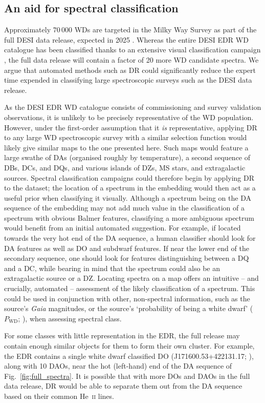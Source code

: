 \documentclass[fleqn,usenatbib]{mnras}
\begin{document}
\subsection{An aid for spectral classification}

Approximately $70\,000$ WDs are targeted in the Milky Way Survey as part of the full DESI data release, expected in 2025 \citep{cooper23}.
Whereas the entire DESI EDR WD catalogue has been classified thanks to an extensive visual classification campaign \citep{manser24}, the full data release will contain a factor of 20 more WD candidate spectra.
We argue that automated methods such as DR could significantly reduce the expert time expended in classifying large spectroscopic surveys such as the DESI data release.

As the DESI EDR WD catalogue consists of commissioning and survey validation observations, it is unlikely to be precisely representative of the WD population.
However, under the first-order assumption that it \textit{is} representative, applying DR to any large WD spectroscopic survey with a similar selection function would likely give similar maps to the one presented here.
Such maps would feature a large swathe of DAs (organised roughly by temperature), a second sequence of DBs, DCs, and DQs, and various islands of DZs, MS stars, and extragalactic sources.
Spectral classification campaigns could therefore begin by applying DR to the dataset; the location of a spectrum in the embedding would then act as a useful prior when classifying it visually.
Although a spectrum being on the DA sequence of the embedding may not add much value in the classification of a spectrum with obvious Balmer features, classifying a more ambiguous spectrum would benefit from an initial automated suggestion.
For example, if located towards the very hot end of the DA sequence, a human classifier should look for DA features as well as DO and subdwarf features.
If near the lower end of the secondary sequence, one should look for features distinguishing between a DQ and a DC, while bearing in mind that the spectrum could also be an extragalactic source or a DZ.
Locating spectra on a map offers an intuitive -- and crucially, automated -- assessment of the likely classification of a spectrum.
This could be used in conjunction with other, non-spectral information, such as the source's \textit{Gaia} magnitudes, or the source's `probability of being a white dwarf' ($P_\text{WD}$; \citealt{gentilefusillo15}), when assessing spectral class.

For some classes with little representation in the EDR, the full release may contain enough similar objects for them to form their own cluster.
For example, the EDR contains a single white dwarf classified DO (J171600.53+422131.17; \citealt{manser24}), along with 10 DAOs, near the hot (left-hand) end of the DA sequence of Fig.~\ref{fig:full_spectra}.
It is possible that with more DOs and DAOs in the full data release, DR would be able to separate them out from the DA sequence based on their common He~\textsc{ii} lines.
\end{document}
